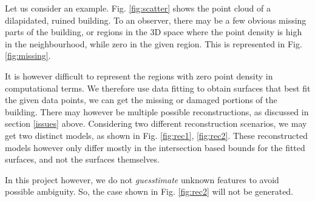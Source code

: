 \documentclass[12pt,a4paper]{article}
\begin{document}
    Let us consider an example. Fig. \ref{fig:scatter} shows the point cloud of a dilapidated, ruined building. To an observer, there may be a few obvious missing parts of the building, or regions in the 3D space where the point density is high in the neighbourhood, while zero in the given region. This is represented in Fig. \ref{fig:missing}.
    
    It is however difficult to represent the regions with zero point density in computational terms. We therefore use data fitting to obtain surfaces that best fit the given data points, we can get the missing or damaged portions of the building. There may however be multiple possible reconstructions, as discussed in section \ref{issues} above. Considering two different reconstruction scenarios, we may get two distinct models, as shown in Fig. \ref{fig:rec1}, \ref{fig:rec2}. These reconstructed models however only differ mostly in the intersection based bounds for the fitted surfaces, and not the surfaces themselves.
    
    In this project however, we do not \textit{guesstimate} unknown features to avoid possible ambiguity. So, the case shown in Fig. \ref{fig:rec2} will not be generated.
    
    
    
\end{document}
